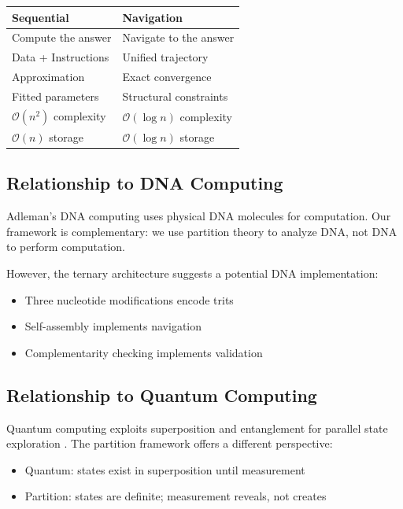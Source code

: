 \documentclass[twocolumn,10pt]{article}
\theoremstyle{remark}
\newcommand{\bigO}{\mathcal{O}}
\begin{document}
\begin{center}
\begin{tabular}{ll}
\toprule
Sequential & Navigation \\
\midrule
Compute the answer & Navigate to the answer \\
Data + Instructions & Unified trajectory \\
Approximation & Exact convergence \\
Fitted parameters & Structural constraints \\
$\bigO(n^2)$ complexity & $\bigO(\log n)$ complexity \\
$\bigO(n)$ storage & $\bigO(\log n)$ storage \\
\bottomrule
\end{tabular}
\end{center}

\subsection{Relationship to DNA Computing}

Adleman's DNA computing \citep{adleman1994molecular} uses physical DNA molecules for computation. Our framework is complementary: we use partition theory to analyze DNA, not DNA to perform computation.

However, the ternary architecture suggests a potential DNA implementation:
\begin{itemize}
\item Three nucleotide modifications encode trits
\item Self-assembly implements navigation
\item Complementarity checking implements validation
\end{itemize}

\subsection{Relationship to Quantum Computing}

Quantum computing exploits superposition and entanglement for parallel state exploration \citep{nielsen2010quantum}. The partition framework offers a different perspective:

\begin{itemize}
\item Quantum: states exist in superposition until measurement
\item Partition: states are definite; measurement reveals, not creates
\end{itemize}
\end{document}
